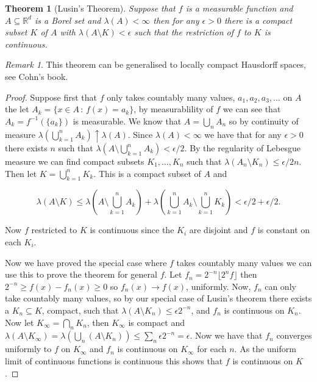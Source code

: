 \documentclass[
]{book}
\newtheorem{theorem}{Theorem}[chapter]
\theoremstyle{definition}
\theoremstyle{definition}
\theoremstyle{definition}
\theoremstyle{definition}
\theoremstyle{remark}
\newtheorem*{remark}{Remark}
\begin{document}
\begin{theorem}[Lusin's Theorem]
Suppose that \(f\) is a measurable function and \(A \subseteq \mathbb{R}^d\) is a Borel set and \(\lambda(A) < \infty\) then for any \(\epsilon >0\) there is a compact subset \(K\) of \(A\) with \(\lambda(A \setminus K) < \epsilon\) such that the restriction of \(f\) to \(K\) is continuous.
\end{theorem}

\begin{remark}
This theorem can be generalised to locally compact Hausdorff spaces, see Cohn's book.
\end{remark}

\begin{proof}
Suppose first that \(f\) only takes countably many values, \(a_1, a_2, a_3, \dots\) on \(A\) the let \(A_k = \{ x \in A \,:\, f(x) = a_k\}\), by measurablility of \(f\) we can see that \(A_k = f^{-1}(\{a_k\})\) is measurable. We know that \(A = \bigcup_n A_n\) so by continuity of measure \(\lambda(\bigcup_{k=1}^n A_k) \uparrow \lambda(A)\). Since \(\lambda(A) < \infty\) we have that for any \(\epsilon >0\) there exists \(n\) such that \(\lambda(A \setminus \bigcup_{k=1}^n A_k) < \epsilon/2\). By the regularity of Lebesgue measure we can find compact subsets \(K_1, \dots, K_n\) such that \(\lambda(A_n \setminus K_n) \leq \epsilon/2n\). Then let \(K = \bigcup_{k=1}^n K_k\). This is a compact subset of \(A\) and

\[ \lambda(A \setminus K) \leq \lambda(A\setminus \bigcup_{k=1}^n A_k) + \lambda(\bigcup_{k=1}^n A_k \setminus \bigcup_{k=1}^n K_k ) < \epsilon/2 + \epsilon/2. \]

Now \(f\) restricted to \(K\) is continuous since the \(K_i\) are disjoint and \(f\) is constant on each \(K_i\).

Now we have proved the special case where \(f\) takes countably many values we can use this to prove the theorem for general \(f\). Let \(f_n = 2^{-n} \lfloor 2^n f \rfloor\) then \(2^{-n} \geq f(x)-f_n(x) \geq 0\) so \(f_n(x) \rightarrow f(x)\), uniformly. Now, \(f_n\) can only take countably many values, so by our special case of Lusin's theorem there exists a \(K_n \subseteq K\), compact, such that \(\lambda(A \setminus K_n) \leq \epsilon 2^{-n}\), and \(f_n\) is continuous on \(K_n\). Now let \(K_\infty = \bigcap_n K_n\), then \(K_\infty\) is compact and \(\lambda(A \setminus K_\infty) = \lambda (\bigcup_n(A \setminus K_n)) \leq \sum_n \epsilon 2^{-n} = \epsilon\). Now we have that \(f_n\) converges uniformly to \(f\) on \(K_\infty\) and \(f_n\) is continuous on \(K_\infty\) for each \(n\). As the uniform limit of continuous functions is continuous this shows that \(f\) is continuous on \(K\).
\end{proof}
\end{document}
